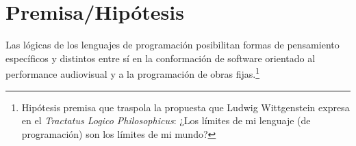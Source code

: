 \section*{Premisa/Hipótesis}

Las lógicas de los lenguajes de programación posibilitan formas de pensamiento específicos y distintos entre sí en la conformación de software orientado al performance audiovisual y a la programación de obras fijas.\footnote{Hipótesis premisa que traspola la propuesta que Ludwig Wittgenstein expresa en el \textit{Tractatus Logico Philosophicus}: ¿Los límites de mi lenguaje (de programación) son los límites de mi mundo?}
